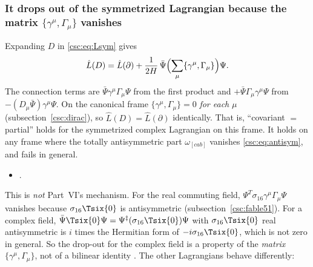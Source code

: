 \subsubsection{It drops out of the symmetrized Lagrangian because the matrix \texorpdfstring{$\{\gamma^\mu,\Gamma_\mu\}$}{anticommutator} vanishes}
\label{sec:6.12.2}

Expanding $D$ in \eqref{csc:eq:Lsym} gives \cfderived
\begin{equation}
  \hat L(D)=\hat L(\partial)+\frac{1}{2H}\,\bar\Psi\Bigl(\sum_\mu\{\gamma^\mu,\Gamma_\mu\}\Bigr)\Psi .
\end{equation}
The connection terms are $\bar\Psi\gamma^\mu\Gamma_\mu\Psi$ from the first product and
$+\bar\Psi\Gamma_\mu\gamma^\mu\Psi$ from $-(D_\mu\bar\Psi)\gamma^\mu\Psi$. On the canonical frame
$\{\gamma^\mu,\Gamma_\mu\}=0$ \emph{for each} $\mu$ (subsection~\ref{csc:dirac}), so
$\hat L(D)=\hat L(\partial)$ identically. That is, ``covariant $=$ partial'' holds for the
symmetrized complex Lagrangian on this frame. It holds on any frame where the totally antisymmetric
part $\omega_{[cab]}$ vanishes \eqref{csc:eq:antisym}, and fails in general.
\begin{itemize}
  \item {} .
\end{itemize}
This is \emph{not} Part~VI's mechanism. For the real commuting field,
$\Psi^T\sigma_{16}\gamma^\mu\Gamma_\mu\Psi$ vanishes because $\sigma_{16}\Tsix{0}$ is antisymmetric
(subsection~\ref{csc:fable51}). For a complex field,
$\bar\Psi\Tsix{0}\Psi=\Psi^\ddagger(\sigma_{16}\Tsix{0})\Psi$ with $\sigma_{16}\Tsix{0}$ real
antisymmetric is $i$ times the Hermitian form of $-i\sigma_{16}\Tsix{0}$, which is not zero in
general. So the drop-out for the complex field is a property of the \emph{matrix}
$\{\gamma^\mu,\Gamma_\mu\}$, not of a bilinear identity \cfderived. The other Lagrangians behave
differently:
